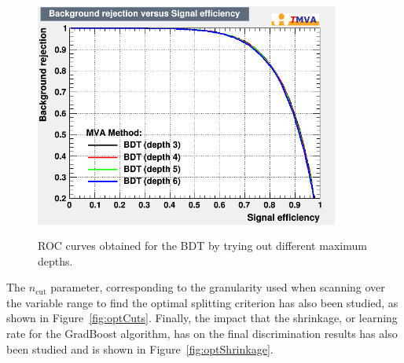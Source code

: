 \documentclass[a4paper, 10pt, openright]{report}
\begin{document}
\begin{appendices}

\begin{figure}[htbp]
\centering
\includegraphics[width=10cm, height=8cm]{figs/BDT_depths.png}
\caption{\ac{ROC} curves obtained for the \ac{BDT} by trying out different maximum depths.}
\label{fig:optDepth}
\end{figure}

The $n_{\text{cut}}$ parameter, corresponding to the granularity used when scanning over the variable range to find the optimal splitting criterion has also been studied, as shown in Figure~\ref{fig:optCuts}. Finally, the impact that the shrinkage, or learning rate for the GradBoost algorithm, has on the final discrimination results has also been studied and is shown in Figure~\ref{fig:optShrinkage}.


\end{appendices}
\end{document}

